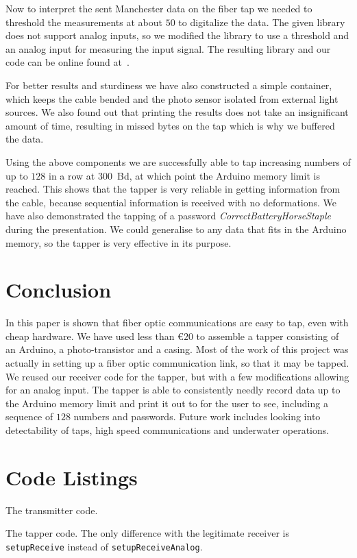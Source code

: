 \documentclass[11pt,twoside,a4paper]{scrartcl}
\begin{document}
		Now to interpret the sent Manchester data on the fiber tap we needed to threshold the measurements
		at about $50$ to digitalize the data.
		The given library does not support analog inputs, so we modified the library to use
		a threshold and an analog input for measuring the input signal.
		The resulting library and our code can be online found at~\cite{analogmanchestercoding}.

		For better results and sturdiness we have also constructed a simple container,
		which keeps the cable bended and the photo sensor isolated from external light sources.
		We also found out that printing the results does not take an insignificant amount of time,
		resulting in missed bytes on the tap which is why we buffered the data.

		Using the above components we are successfully able to tap increasing numbers of up to
		$128$ in a row at \SI{300}{Bd}, at which point the Arduino memory limit is reached.
		This shows that the tapper is very reliable in getting information from the cable,
		because sequential information is received with no deformations.
		We have also demonstrated the tapping of a password \emph{CorrectBatteryHorseStaple} during the presentation.
		We could generalise to any data that fits in the Arduino memory,
		so the tapper is very effective in its purpose.

\section{Conclusion}
	In this paper is shown that fiber optic communications are easy to tap, even with cheap hardware.
	We have used less than \euro{}$20$ to assemble a tapper consisting of an Arduino,
	a photo-transistor and a casing.
	Most of the work of this project was actually in setting up a fiber optic communication link,
	so that it may be tapped.
	We reused our receiver code for the tapper, but with a few modifications allowing for an analog input.
	The tapper is able to consistently needly record data up to the Arduino memory limit and print it out to for the user to see,
	including a sequence of $128$ numbers and passwords.
	Future work includes looking into detectability of taps, high speed communications
	and underwater operations.




\appendix
	\section{Code Listings}
		\begin{listing}
			\caption{The transmitter code.}
			\label{lst:transmitterCode}
		\end{listing}

		\begin{listing}
			\cfile{../receiver/receiver.ino}
			\caption{The tapper code.
				The only difference with the legitimate receiver is \texttt{setupReceive} instead of \texttt{setupReceiveAnalog}.}
			\label{lst:receiverCode}
		\end{listing}
\end{document}
